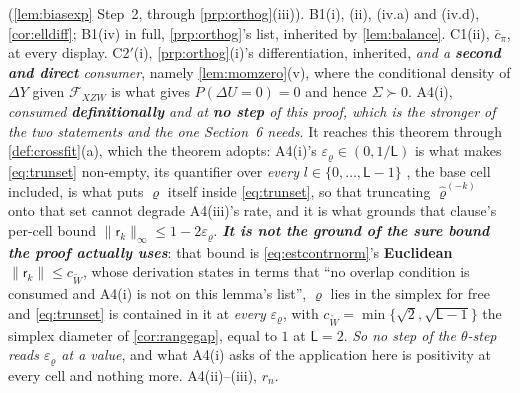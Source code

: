 \begin{remark}
\begin{enumerate}
(\cref{lem:biasexp} Step~2, through \cref{prp:orthog}(iii)).
B1(i), (ii), (iv.a) and (iv.d), \cref{cor:elldiff}; B1(iv) in full, \cref{prp:orthog}'s list, inherited by
\cref{lem:balance}. C1(ii), $\bar c_\pi$, at every display. C2$'$(i), \cref{prp:orthog}(i)'s
differentiation, inherited, \emph{and a \textbf{second and direct} consumer}, namely
\cref{lem:momzero}\textup{(v)}, where the conditional density of $\Delta Y$ given $\mathcal F_{XZW}$ is
what gives $P(\Delta U=0)=0$ and hence $\Sigma\succ0$. A4(i), \emph{consumed \textbf{definitionally} and at \textbf{no step} of this proof, which is the
stronger of the two statements and the one Section~6 needs}. It reaches this theorem through
\cref{def:crossfit}\textup{(a)}, which the theorem adopts: A4(i)'s $\varepsilon_\varrho\in(0,1/\mathsf L)$
is what makes \eqref{eq:trunset} non-empty, its quantifier over \emph{every} $l\in\{0,\dots,\mathsf L-1\}$
, the base cell included, is what puts $\varrho$ itself inside \eqref{eq:trunset}, so that truncating
$\hat\varrho^{(-k)}$ onto that set cannot degrade A4(iii)'s rate, and it is what grounds that clause's
per-cell bound $\|\mathsf r_k\|_\infty\le1-2\varepsilon_\varrho$. \emph{\textbf{It is not the ground of
the sure bound the proof actually uses}}: that bound is \eqref{eq:estcontrnorm}'s \textbf{Euclidean}
$\|\mathsf r_k\|\le c_{\widetilde W}$, whose derivation states in terms that ``no overlap condition is
consumed and A4(i) is not on this lemma's list'', $\varrho$ lies in the simplex for free and
\eqref{eq:trunset} is contained in it at \emph{every} $\varepsilon_\varrho$, with
$c_{\widetilde W}=\min\{\sqrt2,\sqrt{\mathsf L-1}\}$ the simplex diameter of \cref{cor:rangegap}, equal to
$1$ at $\mathsf L=2$. \emph{So no step of the $\theta$-step reads $\varepsilon_\varrho$ at a value}, and
what A4(i) asks of the application here is positivity at every cell and nothing more.
A4(ii)--(iii), $r_n$.

\end{enumerate}
\end{remark}
